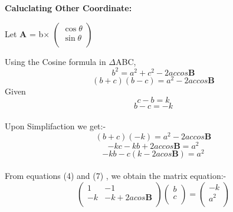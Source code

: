 \documentclass{article}
\let\vec\mathbf
\begin{document}
\raggedright\textbf{Caluclating Other Coordinate: } \\
  \raggedright Let $\vec{A}$ = b$\times$
  $\begin{pmatrix} 
 \cos \theta\\
  \sin\theta \\
\end{pmatrix}$ \\
\raggedright Using the Cosine formula in  $\Delta$ABC, \\ \vspace{3mm}
\begin{equation}
{b}^2 = {a}^2 + {c}^2 - 2accos\vec{B}
\end{equation}
\begin{equation}
(b+c)(b-c) = {a}^2- 2accos\vec{B}
\end{equation}
Given
\begin{equation}
        c-b=k
	\end{equation}
  \begin{equation}
        b-c=-k
 \end{equation}\\
Upon Simplifaction we get:- \\
\begin{equation}
(b+c)(-k) = {a}^2- 2accos\vec{B}
\end{equation}
\begin{equation}
-kc-kb+2accos\vec{B}= {a}^2
\end{equation}
\begin{equation}
-kb-c(k-2acos\vec{B})= {a}^2
\end{equation} \\
\pagebreak
     From equations (4) and (7) , we obtain the matrix equation:- \\ \vspace{3mm}
     \begin{equation}
        \begin{pmatrix}
	   1 & -1  \\	
	  -k & -k+2acos\vec{B}    \\
        \end{pmatrix}
        \begin{pmatrix}
            b \\
            c \\
        \end{pmatrix}
           =
           \begin{pmatrix}
            -k\\
            a^2\\
        \end{pmatrix}   
\end{equation}	     
\end{document}
